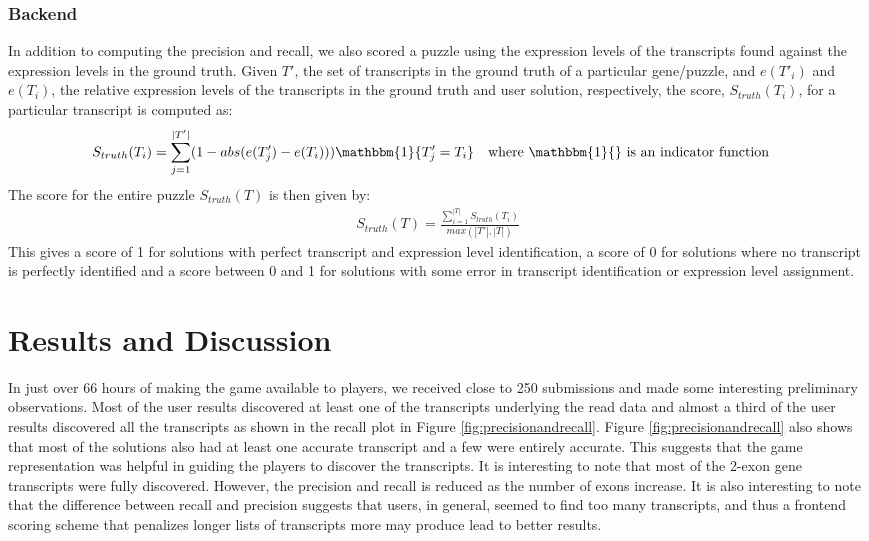 \documentclass[12pt]{article}
\begin{document}
\subsubsection*{Backend}
In addition to computing the precision and recall, we also scored a puzzle using the expression levels of the transcripts found against the expression levels in the ground truth. Given $T'$, the set of transcripts in the ground truth of a particular gene/puzzle, and $e(T'_i)$ and $e(T_i)$, the relative expression levels of the transcripts in the ground truth and user solution, respectively, the score, $S_{truth}(T_i)$, for a particular transcript is computed as:
\begin{align*}
S_{truth}(T_i) &= \sum\limits_{j = 1}^{|T'|}(1 - abs(e(T'_j) - e(T_i)))\mathbbm{1}\{T'_j = T_i\} \quad \text{where $\mathbbm{1}\{\}$ is an indicator function}
\end{align*}
The score for the entire puzzle $S_{truth}(T)$ is then given by:
\begin{align*}
S_{truth}(T) = \frac{\sum\limits_{i=1}^{|T|} S_{truth}(T_i)}{max(|T'|, |T|)}
\end{align*}
This gives a score of 1 for solutions with perfect transcript and expression level identification, a score of 0 for solutions where no transcript is perfectly identified and a score between 0 and 1 for solutions with some error in transcript identification or expression level assignment.

\section*{Results and Discussion}
In just over 66 hours of making the game available to players, we received close to 250 submissions and made some interesting preliminary observations. Most of the user results discovered at least one of the transcripts underlying the read data and almost a third of the user results discovered all the transcripts as shown in the recall plot in Figure \ref{fig:precisionandrecall}. Figure \ref{fig:precisionandrecall} also shows that most of the solutions also had at least one accurate transcript and a few were entirely accurate. This suggests that the game representation was helpful in guiding the players to discover the transcripts. It is interesting to note that most of the 2-exon gene transcripts were fully discovered. However, the precision and recall is reduced as the number of exons increase. It is also interesting to note that the difference between recall and precision suggests that users, in general, seemed to find too many transcripts, and thus a frontend scoring scheme that penalizes longer lists of transcripts more may produce lead to better results.
\end{document}
